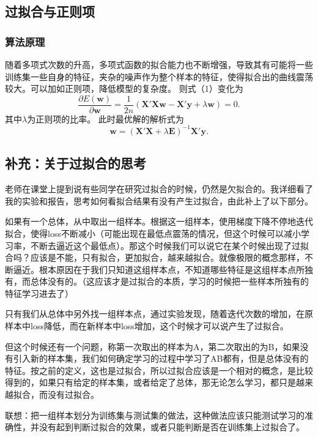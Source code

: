 \documentclass[withoutpreface,bwprint]{cumcmthesis}
\begin{document}
\subsection{过拟合与正则项}
\subsubsection{算法原理}
随着多项式次数的升高，多项式函数的拟合能力也不断增强，导致其有可能将一些训练集一些自身的特征，夹杂的噪声作为整个样本的特征，使得拟合出的曲线震荡较大。可以加如正则项，降低模型的复杂度。
则式（1）变化为
\begin{equation*}
\label{partial equation}
\frac{\partial{E\left(\boldsymbol{w}\right)}}{\partial{\boldsymbol{w}}}=\frac{1}{2n}\left(
\boldsymbol{{X}'Xw}-\boldsymbol{{X}'y}+\lambda \boldsymbol{w}\right)=0.
\end{equation*}
其中$\lambda$为正则项的比率。
此时最优解的解析式为
\begin{equation*}
\boldsymbol{w}={\left(\boldsymbol{{X}'X}+\lambda \boldsymbol{E}\right)}^{-1}\boldsymbol{{X}'y}.
\end{equation*}

\subsection{补充：关于过拟合的思考}
老师在课堂上提到说有些同学在研究过拟合的时候，仍然是欠拟合的。我详细看了我的实验和报告，思考如何看拟合结果有没有产生过拟合，由此补上了以下部分。

如果有一个总体，从中取出一组样本。根据这一组样本，使用梯度下降不停地迭代拟合，使得loss不断减小（可能出现在最低点震荡的情况，但这个时候可以减小学习率，不断去逼近这个最低点）。那这个时候我们可以说它在某个时候出现了过拟合吗？应该是不能，只有拟合，更加拟合，越来越拟合。就像极限的概念那样，不断逼近。根本原因在于我们只知道这组样本点，不知道哪些特征是这组样本点所独有，而总体没有的。（这应该才是过拟合的本质，学习的时候把一些样本所独有的特征学习进去了）

只有我们从总体中另外找一组样本点，通过实验发现，随着迭代次数的增加，在原样本中loss降低，而在新样本中loss增加，这个时候才可以说产生了过拟合。

但这个时候还有一个问题，称第一次取出的样本为A，第二次取出的为B，如果没有引入新的样本集，我们如何确定学习的过程中学习了AB都有，但是总体没有的特征。按之前的定义，这也是过拟合，所以过拟合应该是一个相对的概念，是比较得到的，如果只有给定的样本集，或者给定了总体，那无论怎么学习，都只是越来越拟合，而没有过拟合。

联想：把一组样本划分为训练集与测试集的做法，这种做法应该只能测试学习的准确性，并没有起到判断过拟合的效果，或者只能判断是否在训练集上过拟合了。
\end{document}
